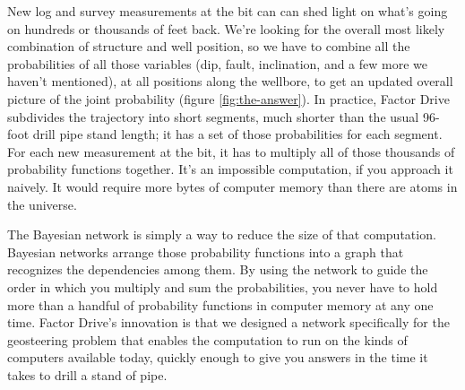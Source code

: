 \documentclass{tufte-handout}
\begin{document}
New log and survey measurements at the bit can can shed light on what's going on hundreds or thousands of feet back. We're looking for the overall most likely combination of structure and
well position, so we have to combine all the probabilities of all those variables (dip, fault,
inclination, and a few more we haven't mentioned), at all positions along the wellbore, to get
an updated overall picture of the joint probability (figure \ref{fig:the-answer}).
In practice, Factor Drive subdivides the trajectory into short segments,
much shorter than the usual 96-foot drill pipe stand length; it has a set of those
probabilities for each segment. For each new measurement at the bit, it has to multiply 
all of those thousands of probability functions together. It's an impossible computation, if
you approach it naively. It would require more bytes of computer memory than there are
atoms in the universe.


The Bayesian network is simply a way to reduce the size of that computation. 
Bayesian networks arrange those probability functions into a graph that recognizes
the dependencies among them. By using the network to guide the order in which you multiply
and sum the probabilities, you never have to hold more than a handful of probability 
functions in computer memory at any one time. Factor Drive's innovation is that we designed
a network specifically for the geosteering problem that enables the computation to run
on the kinds of computers available today, quickly enough to give you answers in the
time it takes to drill a stand of pipe.



\end{document}
